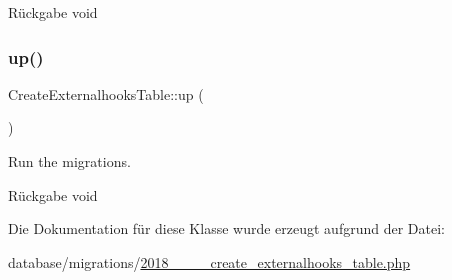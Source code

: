 \begin{DoxyReturn}{Rückgabe}
void 
\end{DoxyReturn}
\mbox{\label{classCreateExternalhooksTable_a5b5d0eca57170eb53040a6a166c8bde9}} 
\subsubsection{\texorpdfstring{up()}{up()}}
{\footnotesize\ttfamily Create\+Externalhooks\+Table\+::up (\begin{DoxyParamCaption}{ }\end{DoxyParamCaption})}

Run the migrations.

\begin{DoxyReturn}{Rückgabe}
void 
\end{DoxyReturn}


Die Dokumentation für diese Klasse wurde erzeugt aufgrund der Datei\+:\begin{DoxyCompactItemize}
\item 
database/migrations/\hyperlink{2018__06__12__162233__create__externalhooks__table_8php}{2018\+\_\+\_\+\_\+\_\+create\+\_\+externalhooks\+\_\+table.\+php}\end{DoxyCompactItemize}
